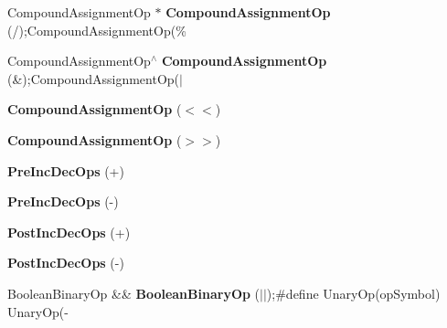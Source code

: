 \begin{DoxyCompactItemize}
\item 
\mbox{\label{classrlbox_1_1tainted__base__impl_aece2071face2e9e95aa270173a93e5cd}} 
Compound\+Assignment\+Op $\ast$ {\bfseries Compound\+Assignment\+Op} (/);Compound\+Assignment\+Op(\%
\item 
\mbox{\label{classrlbox_1_1tainted__base__impl_a695650ceddb22aee9f17b290e721dbd8}} 
Compound\+Assignment\+Op$^\wedge$ {\bfseries Compound\+Assignment\+Op} (\&);Compound\+Assignment\+Op($\vert$
\item 
\mbox{\label{classrlbox_1_1tainted__base__impl_ac234712a7d68b938c9c2f34bd4f96d73}} 
{\bfseries Compound\+Assignment\+Op} ($<$$<$)
\item 
\mbox{\label{classrlbox_1_1tainted__base__impl_a532585754028205606cdc219e61cacce}} 
{\bfseries Compound\+Assignment\+Op} ($>$$>$)
\item 
\mbox{\label{classrlbox_1_1tainted__base__impl_a6c8dca7aef6cbf28dec6cba42963e76a}} 
{\bfseries Pre\+Inc\+Dec\+Ops} (+)
\item 
\mbox{\label{classrlbox_1_1tainted__base__impl_ab9decc76ea24942932c7288d2ee257c3}} 
{\bfseries Pre\+Inc\+Dec\+Ops} (-\/)
\item 
\mbox{\label{classrlbox_1_1tainted__base__impl_a2ccdf93dd8466df3985c4f7c9225af08}} 
{\bfseries Post\+Inc\+Dec\+Ops} (+)
\item 
\mbox{\label{classrlbox_1_1tainted__base__impl_a091f18be8cd32b34bec75322364e1f1d}} 
{\bfseries Post\+Inc\+Dec\+Ops} (-\/)
\item 
\mbox{\label{classrlbox_1_1tainted__base__impl_a59f056b2d926bd2c715aebb7295f0348}} 
Boolean\+Binary\+Op \&\& {\bfseries Boolean\+Binary\+Op} ($\vert$$\vert$);\#define Unary\+Op(op\+Symbol) Unary\+Op(-\/
\item 
\mbox{\label{classrlbox_1_1tainted__base__impl_ac450c85ec8fa3c5046bcf3fb7aeca2d1}} 
$$
\end{DoxyCompactItemize}
